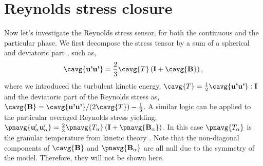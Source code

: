 \section{Reynolds stress closure}
Now let's investigate the Reynolds stress sensor, for both the continuous and the particular phase.
We first decompose the stress tensor by a sum of a spherical and deviatoric part \citep[chapter 6]{morel2015mathematical}, such as, 
\begin{equation*}
    \cavg{\textbf{u'u'}}
    = \frac{2}{3}\cavg{T}\left(
        \textbf{I}
        + \cavg{\textbf{B}}
    \right),
\end{equation*}
where we introduced the turbulent kinetic energy, $\cavg{T} = \frac{1}{2}\cavg{\textbf{u'u'}}:\textbf{I}$ and the deviatoric part of the Reynolds stress as, 
$\cavg{\textbf{B}} = \cavg{\textbf{u'u'}}/(2\cavg{T}) - \frac{1}{3}$.
A similar logic can be applied to the particular averaged Reynolds stress yielding, 
$
\pnavg{\textbf{u}'_\alpha \textbf{u}_\alpha'}
    = \frac{2}{3}\pnavg{T_\alpha}\left(
        \textbf{I}
        + \pnavg{\textbf{B}_\alpha}
    \right)
$.
In this case $\pnavg{T_\alpha}$ is the granular temperature from kinetic theory \citep{rao2008introduction}. 
Note that the non-diagonal components of $\cavg{\textbf{B}}$ and  $\pnavg{\textbf{B}_\alpha}$ are all null due to the symmetry of the model. 
Therefore, they will not be shown here. 
